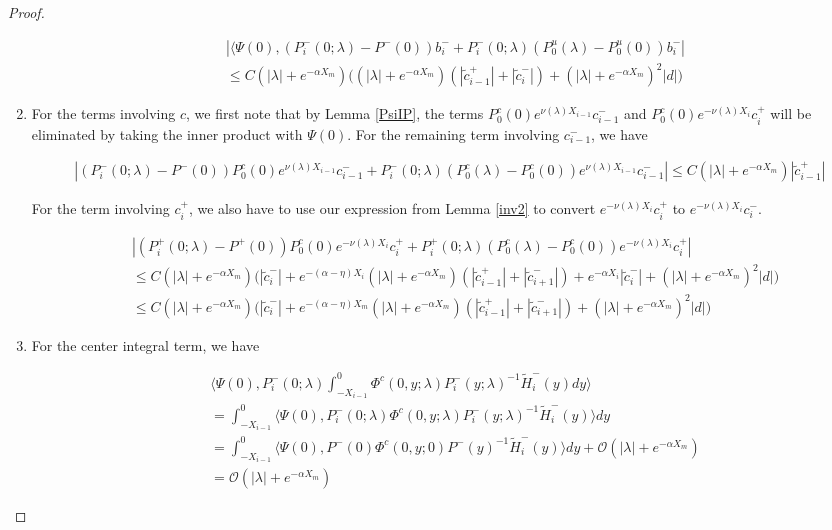 \documentclass[thesis.tex]{subfiles}
\begin{document}
\begin{lemma}
\begin{proof}
\begin{enumerate}
\begin{align*}
&|\langle \Psi(0), (P_i^-(0; \lambda) - P^-(0))b_i^- + P_i^-(0; \lambda)(P_0^u(\lambda) - P_0^u(0))b_i^-| \\
&\leq C (|\lambda| + e^{-\alpha X_m})\Big( 
(|\lambda| + e^{-\alpha X_m})( |\tilde{c}_{i-1}^+| + |\tilde{c}_i^-|)+ (|\lambda| + e^{-\alpha X_m})^2|d| \Big)
\end{align*}

\item For the terms involving $c$, we first note that by Lemma \ref{PsiIP}, the terms $P_0^c(0) e^{\nu(\lambda) X_{i-1}} c_{i-1}^-$ and $P_0^c(0) e^{-\nu(\lambda)X_i} c_i^+$ will be eliminated by taking the inner product with $\Psi(0)$. For the remaining term involving $c_{i-1}^-$, we have

\begin{align*}
|(P_i^-(0; \lambda) - P^-(0)) P_0^c(0) e^{\nu(\lambda) X_{i-1}} c_{i-1}^- + P_i^-(0; \lambda) (P_0^c(\lambda) - P_0^c(0)) e^{\nu(\lambda) X_{i-1}} c_{i-1}^-| \leq C (|\lambda| + e^{-\alpha X_m})|\tilde{c}_{i-1}^+|
\end{align*}

For the term involving $c_i^+$, we also have to use our expression from Lemma \ref{inv2} to convert $e^{-\nu(\lambda)X_i} c_i^+$ to $e^{-\nu(\lambda)X_i} c_i^-$.

\begin{align*}
&|(P_i^+(0; \lambda) - P^+(0))P_0^c(0) e^{-\nu(\lambda)X_i} c_i^+ + P_i^+(0; \lambda) (P_0^c(\lambda) - P_0^c(0)) e^{-\nu(\lambda)X_i} c_i^+| \\
&\leq C(|\lambda| + e^{-\alpha X_m})\Big( |\tilde{c}_i^-| + e^{-(\alpha - \eta)X_i} (|\lambda| + e^{-\alpha X_m})( |\tilde{c}_{i-1}^+| + |\tilde{c}_{i+1}^-|) 
+ e^{-\alpha X_i}|\tilde{c}_i^-| + (|\lambda| + e^{-\alpha X_m} )^2 |d| \Big) \\
&\leq C(|\lambda| + e^{-\alpha X_m})\Big( |\tilde{c}_i^-| + e^{-(\alpha - \eta)X_m} (|\lambda| + e^{-\alpha X_m})( |\tilde{c}_{i-1}^+| + |\tilde{c}_{i+1}^-|) +  ( |\lambda| + e^{-\alpha X_m} )^2 |d| \Big) 
\end{align*}

\item For the center integral term, we have

\begin{align*}
&\langle \Psi(0), P_i^-(0; \lambda)
\int_{-X_{i-1}}^0 \Phi^c(0, y; \lambda) P_i^-(y; \lambda)^{-1} \tilde{H}_i^-(y) dy \rangle \\
&= \int_{-X_{i-1}}^0 \langle \Psi(0), P_i^-(0; \lambda) \Phi^c(0, y; \lambda) P_i^-(y; \lambda)^{-1} \tilde{H}_i^-(y) \rangle dy \\
&= \int_{-X_{i-1}}^0 \langle \Psi(0), P^-(0) \Phi^c(0, y; 0) P^-(y)^{-1} \tilde{H}_i^-(y) \rangle dy + \mathcal{O}(|\lambda| + e^{-\alpha X_m}) \\
&= \mathcal{O}(|\lambda| + e^{-\alpha X_m})
\end{align*}


\end{enumerate}
\end{proof}
\end{lemma}
\end{document}
